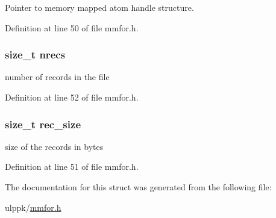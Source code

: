 Pointer to memory mapped atom handle structure. 



Definition at line 50 of file mmfor.\-h.

\hypertarget{struct__mmfor__handle_a218d36060722882d76c8d10b73edb6a6}{
\subsubsection[{nrecs}]{\setlength{\rightskip}{0pt plus 5cm}size\-\_\-t nrecs}}\label{struct__mmfor__handle_a218d36060722882d76c8d10b73edb6a6}


number of records in the file 



Definition at line 52 of file mmfor.\-h.

\hypertarget{struct__mmfor__handle_a6af15626e40c23bd7d5b67f5a54c8344}{
\subsubsection[{rec\-\_\-size}]{\setlength{\rightskip}{0pt plus 5cm}size\-\_\-t rec\-\_\-size}}\label{struct__mmfor__handle_a6af15626e40c23bd7d5b67f5a54c8344}


size of the records in bytes 



Definition at line 51 of file mmfor.\-h.



The documentation for this struct was generated from the following file\-:\begin{DoxyCompactItemize}
\item 
ulppk/\hyperlink{mmfor_8h}{mmfor.\-h}\end{DoxyCompactItemize}
